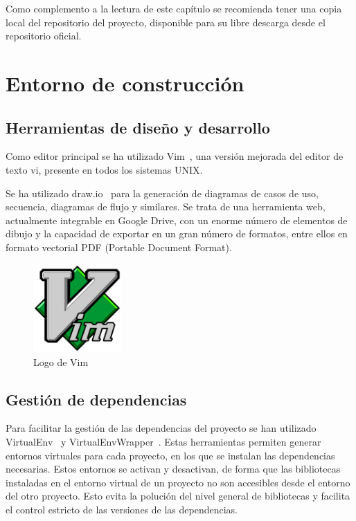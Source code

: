 Como complemento a la lectura de este capítulo se recomienda tener una copia
local del repositorio del proyecto, disponible para su libre descarga desde
el repositorio oficial.

\section{Entorno de construcción}

\subsection{Herramientas de diseño y desarrollo}

Como editor principal se ha utilizado Vim~\cite{vim}, una versión mejorada del editor de
texto vi, presente en todos los sistemas UNIX.

Se ha utilizado draw.io~\cite{draw.io} para la generación de diagramas de casos de uso,
secuencia, diagramas de flujo y similares. Se trata de una herramienta web, 
actualmente integrable en Google Drive, con un enorme número de elementos de
dibujo y la capacidad de exportar en un gran número de formatos, entre ellos en
formato vectorial PDF (Portable Document Format).

\begin{figure}[htbp]
    \centering
    \includegraphics[width=0.3\textwidth]{6_implementacion/vim_logo}
    \caption{Logo de Vim}
    \label{fig:vim-logo}
\end{figure}

\subsection{Gestión de dependencias}

Para facilitar la gestión de las dependencias del proyecto se han utilizado VirtualEnv~\cite{virtualenv}
y VirtualEnvWrapper~\cite{virtualenvwrapper}. Estas herramientas permiten generar
entornos virtuales para cada proyecto, en los que se instalan las dependencias necesarias.
Estos entornos se activan y desactivan, de forma que las bibliotecas instaladas en
el entorno virtual de un proyecto no son accesibles desde el entorno del
otro proyecto. Esto evita la polución del nivel general de bibliotecas y facilita el
control estricto de las versiones de las dependencias.

